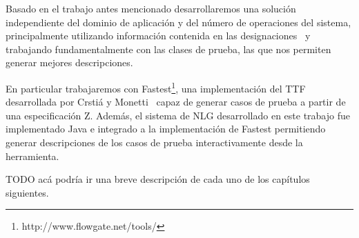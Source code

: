 Basado en el trabajo antes mencionado desarrollaremos una solución independiente del dominio de aplicación y del número de operaciones del sistema, principalmente utilizando información contenida en las designaciones~\cite{jackson} y trabajando fundamentalmente con las clases de prueba, las que nos permiten generar mejores descripciones.

En particular trabajaremos con Fastest\footnote{http://www.flowgate.net/tools/}, una implementación del TTF desarrollada por Crstiá y Monetti~\cite{fastest1} capaz de generar casos de prueba a partir de una especificación Z. Además, el sistema de NLG desarrollado en este trabajo fue implementado Java e integrado a la implementación de Fastest permitiendo generar descripciones de los casos de prueba interactivamente desde la herramienta.


TODO acá podría ir una breve descripción de cada uno de los capítulos siguientes.